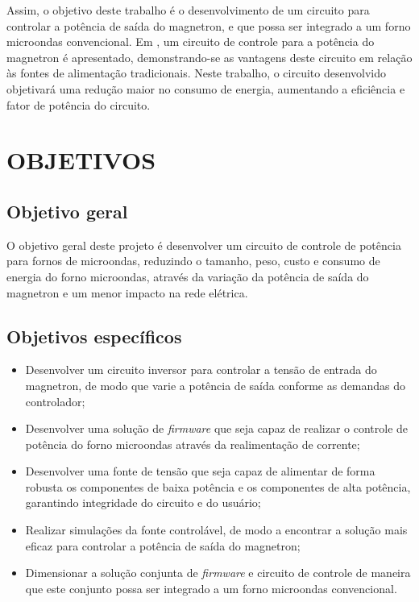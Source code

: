  Assim, o objetivo deste trabalho é o desenvolvimento de um circuito para controlar a potência de saída do magnetron, e que possa ser integrado a um forno microondas convencional. Em \cite{Hidenori1991}, um circuito de controle para a potência do magnetron é apresentado, demonstrando-se as vantagens deste circuito em relação às fontes de alimentação tradicionais. Neste trabalho, o circuito desenvolvido objetivará uma redução maior no consumo de energia, aumentando a eficiência e fator de potência do circuito.


\section{OBJETIVOS}
\label{sec:objetivos}


\subsection{Objetivo geral}
\label{sec:objetivosGerais}

O objetivo geral deste projeto é desenvolver um circuito de controle de potência para fornos de microondas, reduzindo o tamanho, peso, custo e consumo de energia do forno microondas, através da variação da potência de saída do magnetron e um menor impacto na rede elétrica.

\subsection{Objetivos específicos}
\label{sec:objetivosEspecificos}

\begin{itemize}
    \item Desenvolver um circuito inversor para controlar a tensão de entrada do magnetron, de modo que varie a potência de saída conforme as demandas do controlador;
    \item Desenvolver uma solução de \textit{firmware} que seja capaz de realizar o controle de potência do forno microondas através da realimentação de corrente;
    \item Desenvolver uma fonte de tensão que seja capaz de alimentar de forma robusta os componentes de baixa potência e os componentes de alta potência, garantindo integridade do circuito e do usuário;
    \item Realizar simulações da fonte controlável, de modo a encontrar a solução mais eficaz para controlar a potência de saída do magnetron;
    \item Dimensionar a solução conjunta de \textit{firmware} e circuito de controle de maneira que este conjunto possa ser integrado a um forno microondas convencional.
\end{itemize}


